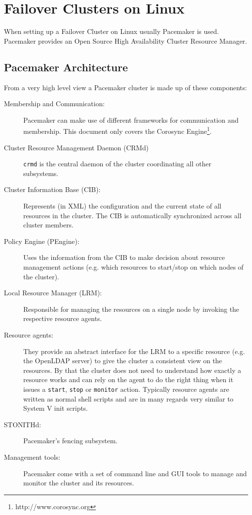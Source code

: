 \documentclass[a4paper,11pt,DIV=12]{scrartcl}
\begin{document}
\section{Failover Clusters on Linux}
    When setting up a Failover Cluster on Linux usually Pacemaker is used.
    Pacemaker provides an Open Source High Availability Cluster
    Resource Manager.

\subsection{Pacemaker Architecture}
    From a very high level view a Pacemaker cluster is made up of these
    components:
    \begin{description}
        \item[Membership and Communication:]
            Pacemaker can make use of different frameworks for communication
            and membership. This document only covers the Corosync
            Engine\footnote{http://www.corosync.org}.
        \item[Cluster Resource Management Daemon (CRMd)]
            \verb|crmd| is the central daemon of the cluster coordinating all
            other subsystems.
        \item[Cluster Information Base (CIB):]
            Represents (in XML) the configuration and the current state of all
            resources in the cluster. The CIB is automatically synchronized
            across all cluster members.
        \item[Policy Engine (PEngine):]
            Uses the information from the CIB to make decision about resource
            management actions (e.g. which resources to start/stop on which
            nodes of the cluster).
        \item[Local Resource Manager (LRM):]
            Responsible for managing the resources on a single node by invoking
            the respective resource agents.
        \item[Resource agents:] They provide an abstract interface for the
            LRM to a specific resource (e.g. the OpenLDAP server) to give the
            cluster a consistent view on the resources.
            By that the cluster does not need to understand how exactly a
            resource works and can rely on the agent to do the right thing when
            it issues a \verb|start|, \verb|stop| or \verb|monitor| action.
            Typically resource agents are written as normal shell scripts and
            are in many regards very similar to System V init scripts.
        \item[STONITHd:]
            Pacemaker's fencing subsystem.
        \item[Management tools:]
            Pacemaker come with a set of command line and GUI tools to
            manage and monitor the cluster and its resources.
    \end{description}
\end{document}
